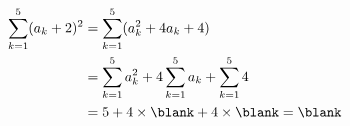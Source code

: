 $\begin{aligned}\displaystyle\sum_{k=1}^{5}(a_k+2)^2&=\displaystyle\sum_{k=1}^{5}(a_k^2+4a_k+4)\\ &=\displaystyle\sum_{k=1}^{5}a_k^2+4\sum_{k=1}^{5}a_k+\sum_{k=1}^{5}4\\ &=5+4\times\blank+4\times\blank=\blank\end{aligned}$
